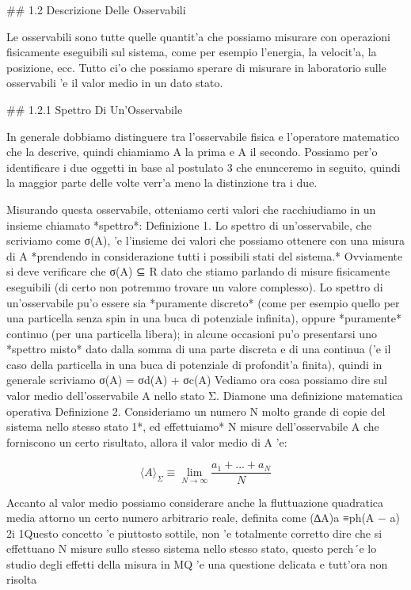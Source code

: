 ## 1.2 Descrizione Delle Osservabili

Le osservabili sono tutte quelle quantit'a che possiamo misurare con operazioni fisicamente eseguibili sul sistema, come per esempio l'energia, la velocit'a, la posizione, ecc. Tutto ci'o che possiamo sperare di misurare in laboratorio sulle osservabili 'e il valor medio in un dato stato.

## 1.2.1 Spettro Di Un'Osservabile

In generale dobbiamo distinguere tra l'osservabile fisica e l'operatore matematico che la descrive, quindi chiamiamo A la prima e A il secondo. Possiamo per'o identificare i due oggetti in base al postulato 3 che enunceremo in seguito, quindi la maggior parte delle volte verr'a meno la distinzione tra i due.

Misurando questa osservabile, otteniamo certi valori che racchiudiamo in un insieme chiamato *spettro*:
Definizione 1. Lo spettro di un'osservabile, che scriviamo come σ(A), 'e l'insieme dei valori che possiamo ottenere con una misura di A *prendendo in considerazione tutti i possibili stati del sistema.*
Ovviamente si deve verificare che σ(A) ⊆ R dato che stiamo parlando di misure fisicamente eseguibili (di certo non potremmo trovare un valore complesso). Lo spettro di un'osservabile pu'o essere sia *puramente discreto*
(come per esempio quello per una particella senza spin in una buca di potenziale infinita), oppure *puramente* continuo (per una particella libera); in alcune occasioni pu'o presentarsi uno *spettro misto* dato dalla somma di una parte discreta e di una continua ('e il caso della particella in una buca di potenziale di profondit'a finita),
quindi in generale scriviamo σ(A) = σd(A) + σc(A)
Vediamo ora cosa possiamo dire sul valor medio dell'osservabile A nello stato Σ. Diamone una definizione matematica operativa Definizione 2. Consideriamo un numero N molto grande di copie del sistema nello stesso stato 1*, ed effettuiamo* N misure dell'osservabile A che forniscono un certo risultato, allora il valor medio di A 'e:

$$\langle A\rangle_{\Sigma}\equiv\operatorname*{lim}_{N\rightarrow\infty}{\frac{a_{1}+...+a_{N}}{N}}$$

Accanto al valor medio possiamo considerare anche la fluttuazione quadratica media attorno un certo numero arbitrario reale, definita come
(∆A)a ≡ph(A − a)
2i 1Questo concetto 'e piuttosto sottile, non 'e totalmente corretto dire che si effettuano N misure sullo stesso sistema nello stesso stato, questo perch´e lo studio degli effetti della misura in MQ 'e una questione delicata e tutt'ora non risolta

